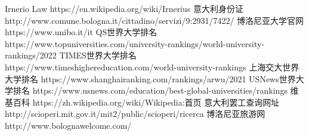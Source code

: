 \begin{thebibliography}{90}             %
\rhead[\fancyplain{}{\bfseries \leftmark}]{\fancyplain{}{\bfseries
\thepage}}
Irnerio Law https://en.wikipedia.org/wiki/Irnerius
意大利身份证 http://www.comune.bologna.it/cittadino/servizi/9:2931/7422/
博洛尼亚大学官网 https://www.unibo.it/it
QS世界大学排名 https://www.topuniversities.com/university-rankings/world-university-rankings/2022
TIMES世界大学排名 https://www.timeshighereducation.com/world-university-rankings
上海交大世界大学排名 https://www.shanghairanking.com/rankings/arwu/2021
USNews世界大学排名 https://www.usnews.com/education/best-global-universities/rankings
维基百科 https://zh.wikipedia.org/wiki/Wikipedia:首页
意大利罢工查询网址 http://scioperi.mit.gov.it/mit2/public/scioperi/ricerca
博洛尼亚旅游网 http://www.bolognawelcome.com/
\end{thebibliography}
